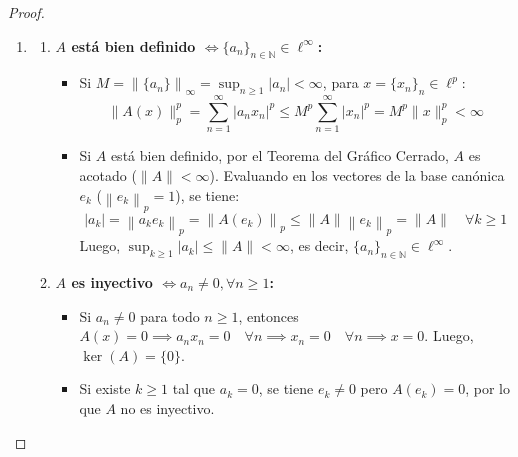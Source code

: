 \documentclass{article}
\theoremstyle{definition}
\newcommand{\norm}[1]{\left\lVert #1 \right\rVert}       %
\begin{document}
\begin{proof}
\begin{enumerate}
\begin{itemize}
                  \item [\((\Leftarrow)\)] Si \(\varphi = \chi_E\) c.t.p., entonces \({\varphi(x)}^2 = {\chi_E(x)}^2 = \chi_E(x) = \varphi(x)\) c.t.p., luego \(M_\varphi^2(f) = \varphi^2 f = \varphi f = M_\varphi(f)\).
              \end{itemize}

        \item \begin{enumerate}
                  \item \textbf{\(A\) está bien definido \(\iff {\{a_n\}}_{n\in\mathbb{N}} \in \ell^\infty \):}
                        \begin{itemize}
                            \item [\((\Leftarrow)\)] Si \(M = \norm{\{a_n\}}_\infty = \sup_{n \ge 1} |a_n| < \infty \), para \(x = {\{x_n\}}_n \in \ell^p\):
                                  \[
                                      \|A(x)\|_p^p = \sum_{n=1}^\infty |a_n x_n|^p \le M^p \sum_{n=1}^\infty |x_n|^p = M^p \|x\|_p^p < \infty
                                  \]
                            \item [\((\Rightarrow)\)] Si \(A\) está bien definido, por el Teorema del Gráfico Cerrado, \(A\) es acotado (\( \|A\| < \infty \)). Evaluando en los vectores de la base canónica \(e_k\) (\(\norm{e_k}_p = 1\)), se tiene:
                                  \[
                                      |a_k| = \norm{a_k e_k}_p = \norm{A(e_k)}_p \le \|A\| \norm{e_k}_p = \|A\| \quad \forall k \ge 1
                                  \]
                                  Luego, \( \sup_{k \ge 1} |a_k| \le \|A\| < \infty \), es decir, \( {\{a_n\}}_{n\in\mathbb{N}} \in \ell^\infty \).
                        \end{itemize}

                  \item \textbf{\(A\) es inyectivo \(\iff a_n \neq 0, \forall n \ge 1\):}
                        \begin{itemize}
                            \item [\((\Leftarrow)\)] Si \(a_n \neq 0\) para todo \(n \ge 1\), entonces \(A(x) = 0 \implies a_n x_n = 0 \quad \forall n \implies x_n = 0 \quad \forall n \implies x = 0\). Luego, \(\ker(A) = \{ 0 \} \).
                            \item [\((\Rightarrow)\)] Si existe \(k \ge 1\) tal que \(a_k = 0\), se tiene \(e_k \neq 0\) pero \(A(e_k) = 0\), por lo que \(A\) no es inyectivo.
                        \end{itemize}


\end{enumerate}
\end{enumerate}
\end{proof}
\end{document}
